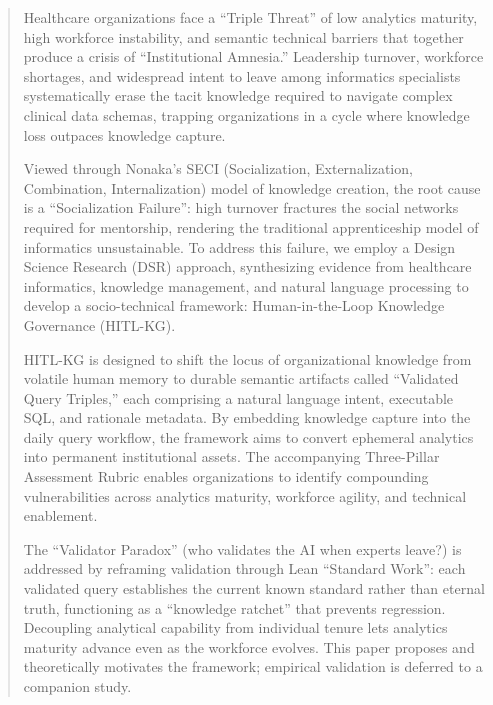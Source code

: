 \documentclass[
  american,
  11pt,
  letterpaper,
  oneside  ,captions=tableheading
]{scrartcl}
\begin{document}
\begin{abstract}
Healthcare organizations face a ``Triple Threat'' of low analytics
maturity, high workforce instability, and semantic technical barriers
that together produce a crisis of ``Institutional Amnesia.'' Leadership
turnover, workforce shortages, and widespread intent to leave among
informatics specialists systematically erase the tacit knowledge
required to navigate complex clinical data schemas, trapping
organizations in a cycle where knowledge loss outpaces knowledge
capture.

Viewed through Nonaka's SECI (Socialization, Externalization,
Combination, Internalization) model of knowledge creation, the root
cause is a ``Socialization Failure'': high turnover fractures the social
networks required for mentorship, rendering the traditional
apprenticeship model of informatics unsustainable. To address this
failure, we employ a Design Science Research (DSR) approach,
synthesizing evidence from healthcare informatics, knowledge management,
and natural language processing to develop a socio-technical framework:
Human-in-the-Loop Knowledge Governance (HITL-KG).

HITL-KG is designed to shift the locus of organizational knowledge from
volatile human memory to durable semantic artifacts called ``Validated
Query Triples,'' each comprising a natural language intent, executable
SQL, and rationale metadata. By embedding knowledge capture into the
daily query workflow, the framework aims to convert ephemeral analytics
into permanent institutional assets. The accompanying Three-Pillar
Assessment Rubric enables organizations to identify compounding
vulnerabilities across analytics maturity, workforce agility, and
technical enablement.

The ``Validator Paradox'' (who validates the AI when experts leave?) is
addressed by reframing validation through Lean ``Standard Work'': each
validated query establishes the current known standard rather than
eternal truth, functioning as a ``knowledge ratchet'' that prevents
regression. Decoupling analytical capability from individual tenure lets
analytics maturity advance even as the workforce evolves. This paper
proposes and theoretically motivates the framework; empirical validation
is deferred to a companion study.
\end{abstract}
\end{document}
